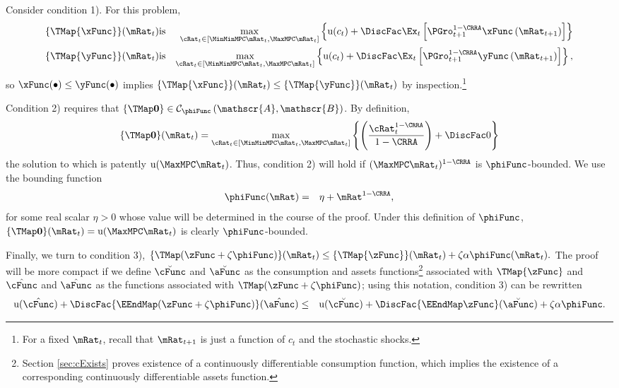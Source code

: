 \documentclass[titlepage]{\econtex}\providecommand{\texname}{BufferStockTheory}%
\begin{document}
Consider condition 1). For this problem,
\begin{eqnarray*}
\{\TMap{\mathfrak{\xFunc}}\}(\mRat_{t}) &\mbox{is}&\underset{\cRat_{t} \in
[\MinMinMPC \mRat_{t}, \MaxMPC \mRat_{t}]
}\max \left\{
\util(c_{t})+\DiscFac \Ex_{t}\left[ {\PGro}_{t+1}^{1-\CRRA }{\mathfrak{\xFunc}}
\left( {\mRat}_{t+1}\right) \right] \right\}  \notag  \label{eq:condition1}
\\
\{\TMap{\mathfrak{\yFunc}}\}(\mRat_{t}) &\mbox{is}&\underset{\cRat_{t} \in
[\MinMinMPC \mRat_{t}, \MaxMPC \mRat_{t}]
}\max \left\{
\util(c_{t})+\DiscFac \Ex_{t}\left[ {\PGro}_{t+1}^{1-\CRRA }{\mathfrak{\yFunc}}
\left( {\mRat}_{t+1}\right) \right] \right\} ,  \notag
\end{eqnarray*}%
so ${\mathfrak{\xFunc}}(\bullet) \leq {\mathfrak{\yFunc}}(\bullet)$ implies $\{\TMap{\mathfrak{\xFunc}}\}(\mRat_{t}) \leq \{\TMap{\mathfrak{\yFunc}} \}(\mRat_{t})$ by inspection.\footnote{For a fixed $\mRat_{t}$, recall that ${\mRat}_{t+1}$ is just a function of $c_{t}$ and the
stochastic shocks.}

Condition 2) requires that $\{\TMap\mathbf{0}\}\in \mathcal{C}_{\phiFunc}\left(\mathscr{A},\mathscr{B}\right)$. By definition,
\begin{equation*}
\{\TMap \mathbf{0}\}(\mRat_{t}) = \max_{\cRat_{t} \in
[\MinMinMPC \mRat_{t}, \MaxMPC \mRat_{t}]
}\left\{ \left( \frac{\cRat_{t}^{1-\CRRA }}{1-\CRRA }\right) +\DiscFac 0\right\}
\end{equation*}
the solution to which is patently
$\util(\MaxMPC \mRat_{t})$. Thus, condition 2)
will hold if $(\MaxMPC \mRat_{t})^{1-\CRRA}$ is $\phiFunc$-bounded.  We use
the bounding function
\begin{eqnarray}
  \label{eq:phiFunc}
  \phiFunc(\mRat) & = & \eta + \mRat^{1-\CRRA},
\end{eqnarray}
for some real scalar $\eta > 0$ whose value will be determined in the
course of the proof. Under this definition of $\phiFunc$,
$\{\TMap\mathbf{0}\}(\mRat_{t})= \util(\MaxMPC \mRat_{t})$
is clearly
$\phiFunc$-bounded.

Finally, we turn to condition 3), $\{\TMap({\zFunc} +\zeta\phiFunc
)\}(\mRat_{t}) \leq \{\TMap{\zFunc}\}(\mRat_{t}) +\zeta \Shrinker
\phiFunc(\mRat_{t}).$ The proof will be more compact if we define
$\breve{\cFunc}$ and $\breve{\aFunc}$ as the consumption and assets
functions\footnote{Section \ref{sec:cExists} proves existence of a
  continuously differentiable consumption function, which implies the
  existence of a corresponding continuously differentiable assets
  function.}  associated with $\TMap{\zFunc}$ and $\hat{\cFunc}$ and
$\hat{\aFunc}$ as the functions associated with $\TMap({\zFunc+\zeta
  \phiFunc})$; using this notation, condition 3) can be rewritten
\begin{eqnarray*}
\util(\hat{\cFunc})+\DiscFac \{\EEndMap (\zFunc+\zeta \phiFunc) \}(\hat{\aFunc})  & \leq & \util(\breve{\cFunc})+\DiscFac \{\EEndMap \zFunc \}(\breve{\aFunc})  + \zeta \Shrinker \phiFunc.
\end{eqnarray*}
\end{document}

